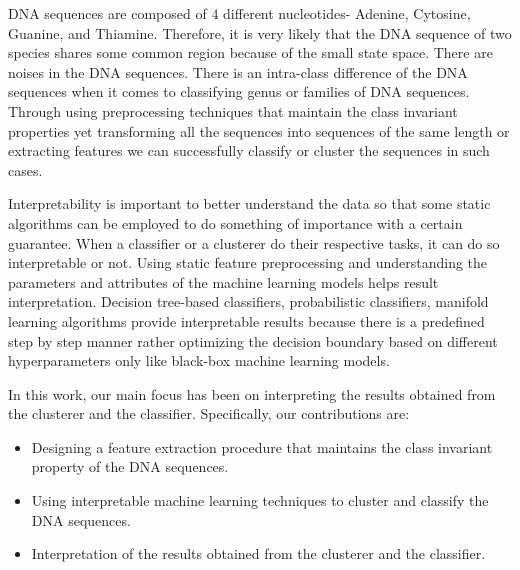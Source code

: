 \documentclass[oneside, twocolumn, a4paper, 10pt]{IEEEtran}
\begin{document}
\par
DNA sequences are composed of $4$ different nucleotides- Adenine, Cytosine, Guanine, and Thiamine. Therefore, it is very likely that the DNA sequence of two species shares some common region because of the small state space. There are noises in the DNA sequences. There is an intra-class difference of the DNA sequences when it comes to classifying genus or families of DNA sequences. Through using preprocessing techniques that maintain the class invariant properties yet transforming all the sequences into sequences of the same length or extracting features we can successfully classify or cluster the sequences in such cases.\\
\par
Interpretability is important to better understand the data so that some static algorithms can be employed to do something of importance with a certain guarantee. When a classifier or a clusterer do their respective tasks, it can do so interpretable or not. Using static feature preprocessing and understanding the parameters and attributes of the machine learning models helps result interpretation. Decision tree-based classifiers, probabilistic classifiers, manifold learning algorithms provide interpretable results because there is a predefined step by step manner rather optimizing the decision boundary based on different hyperparameters only like black-box machine learning models.\\
\par
In this work, our main focus has been on interpreting the results obtained from the clusterer and the classifier. Specifically, our contributions are:
\begin{itemize}
\item Designing a feature extraction procedure that maintains the class invariant property of the DNA sequences.
\item Using interpretable machine learning techniques to cluster and classify the DNA sequences.
\item Interpretation of the results obtained from the clusterer and the classifier.
\end{itemize}

%
\end{document}
